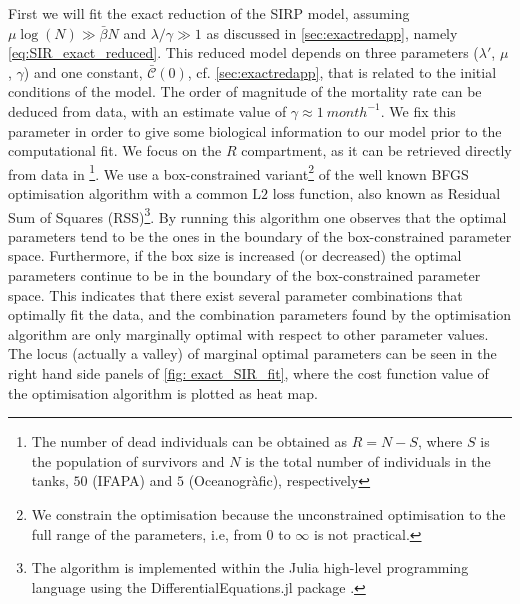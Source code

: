 First we will fit the exact reduction of the SIRP model, assuming
$\mu\log(N)\gg\bar{\beta}N$ and $\lambda/\gamma\gg 1$ as discussed in
\cref{sec:exactredapp}, namely \cref{eq:SIR_exact_reduced}.
This reduced model depends on three parameters ($\lambda'$, $\mu$,
$\gamma$) and one constant, $\bar{\mathcal{C}}(0)$, cf. \cref{sec:exactredapp},
that is related to the initial conditions of the model. The order of magnitude
of the mortality rate can be deduced from data, with an estimate value of
$\gamma\approx\SI{1}{month^{-1}}$. We fix this parameter in order to give some
biological information to our model prior to the computational fit. We focus on
the $R$ compartment, as it can be retrieved directly from data in
\cite{March}\footnote{The number of dead individuals can be obtained as
    $R=N-S$, where $S$ is the population of survivors and $N$ is the total
    number
    of individuals in the tanks,
    $50$ (IFAPA) and $5$ (Oceanogr\`afic), respectively}.
We use a box-constrained variant\footnote{We constrain the optimisation
    because the unconstrained optimisation to the full range of the parameters,
    i.e, from $0$ to $\infty$ is not practical.} of the well known BFGS
optimisation algorithm \cite{BFGS} with a common $\textrm{L}2$ loss function,
also known as Residual Sum of Squares (RSS)\footnote{The algorithm is
    implemented within the Julia high-level programming language \cite{julia}
    using the DifferentialEquations.jl package
    \cite{DifferentialEquations.jl}.}.
By running this algorithm one observes that the optimal parameters tend to be
the ones in the boundary of the box-constrained parameter space.
Furthermore, if the box size is increased (or decreased) the optimal
parameters continue to be in the boundary of the box-constrained parameter
space.
This indicates that there exist several parameter combinations that
optimally fit the data, and the combination parameters found by the
optimisation algorithm are only marginally optimal with respect to other
parameter values. The locus (actually a valley) of marginal optimal parameters
can be seen in the right hand side panels of \cref{fig: exact_SIR_fit}, where
the cost function value of the optimisation algorithm is plotted as heat map.

